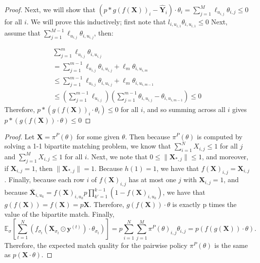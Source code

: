 \begin{proof}
    Next, we will show that $(p*g(f(\mathbf{X}))_{i} - \hat{\mathbf{Y}}_{i}) \cdot \theta_{i} = \sum_{j=1}^{M} \ell_{u_{i,j}} \theta_{i,j} \leq 0$ for all $i$. 
    We will prove this inductively; first note that $l_{i,u_{i,1}} \theta_{i,u_{i,1}} \leq 0$
    Next, assume that $\sum_{j=1}^{M-1} \ell_{u_{i,j}} \theta_{i,u_{i,j}}$, then: 
    
    \begin{align}
        \sum_{j=1}^{m} \ell_{u_{i,j}} \theta_{i,u_{i,j}} \\ = \sum_{j=1}^{m-1} \ell_{u_{i,j}} \theta_{i,u_{i,j}} + \ell_{m} \theta_{i,u_{i,m}} \\ 
        \leq \sum_{j=1}^{m-1} \ell_{u_{i,j}} \theta_{i,u_{i,j}} + \ell_{m} \theta_{i,u_{i,m-1}} \\ 
        \leq (\sum_{j=1}^{m-1} \ell_{u_{i,j}}) (\sum_{j=1}^{m-1} \theta_{i,u_{i,j}} - \theta_{i,u_{i,m-1}}) \leq 0
    \end{align}
Therefore, $p*(g(f(\mathbf{X}))_{i} \cdot \theta_{i}) \leq 0$ for all $i$, and so summing across all $i$ gives $p*(g(f(\mathbf{X})) \cdot \theta) \leq 0$
\end{proof}


\thmtightlowerbound*
\begin{proof}
    Let $\mathbf{X} = \pi^{P}(\theta)$ for some given $\theta$. 
    Then because $\pi^{P}(\theta)$ is computed by solving a 1-1 bipartite matching problem, we know that $\sum_{i=1}^{N} X_{i,j} \leq 1$ for all $j$ and $\sum_{j=1}^{M} X_{i,j} \leq 1$ for all $i$. 
    Next, we note that $0 \leq \lVert \mathbf{X}_{*,j} \rVert \leq 1$, and moreover, if $\mathbf{X}_{i,j} = 1$, then $\lVert \mathbf{X}_{*,j} \rVert = 1$. 
    Because $h(1) = 1$, we have that $f(\mathbf{X})_{i,j} = \mathbf{X}_{i,j}$. 
    Finally, because each row $i$ of $f(\mathbf{X})_{i,j}$ has at most one $j$ with $\mathbf{X}_{i,j} = 1$, and because $\bar{\mathbf{X}}_{i,u_{k}} = f(\mathbf{X})_{i,u_{k}} p \prod_{k'=1}^{k-1} (1-f(\mathbf{X})_{i,u_{k}})$, we have that $g(f(\mathbf{X})) = f(\mathbf{X}) = p \mathbf{X}$. 
    Therefore, $g(f(\mathbf{X})) \cdot \theta$ is exactly p times the value of the bipartite match. 
    Finally, 
    \begin{equation}
        \mathbb{E}_{\sigma}[\sum_{t=1}^{N} (f_{\sigma_{t}}\left(\mathbf{X}_{\sigma_{t}} \odot \mathbf{y}^{(t)}\right)  \cdot \theta_{\sigma_{t}})]  = p \sum_{i=1}^{N} \sum_{j=1}^{M} \pi^{P}(\theta)_{i,j} \theta_{i,j} = p (f(g(\mathbf{X})) \cdot \theta).
    \end{equation}
    Therefore, the expected match quality for the pairwise policy $\pi^{P}(\theta)$ is the same as $p (\mathbf{X} \cdot \theta)$.
\end{proof}
\thmordering*

